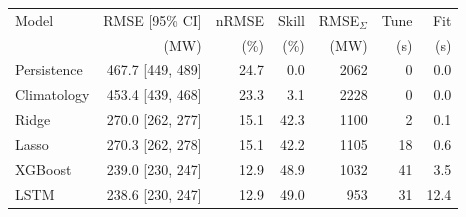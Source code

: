 \begin{tabular}{lrrrrrr}
\toprule
Model & RMSE [95\% CI] & nRMSE & Skill & RMSE$_{\Sigma}$ & Tune & Fit \\
 & (MW) & (\%) & (\%) & (MW) & (s) & (s) \\
\midrule
Persistence & 467.7 [449, 489] & 24.7 & 0.0 & 2062 & 0 & 0.0 \\
Climatology & 453.4 [439, 468] & 23.3 & 3.1 & 2228 & 0 & 0.0 \\
Ridge & 270.0 [262, 277] & 15.1 & 42.3 & 1100 & 2 & 0.1 \\
Lasso & 270.3 [262, 278] & 15.1 & 42.2 & 1105 & 18 & 0.6 \\
XGBoost & 239.0 [230, 247] & 12.9 & 48.9 & 1032 & 41 & 3.5 \\
LSTM & 238.6 [230, 247] & 12.9 & 49.0 & 953 & 31 & 12.4 \\
\bottomrule
\end{tabular}
